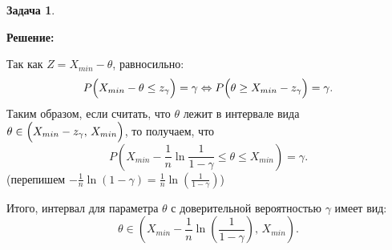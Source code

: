\documentclass[a4paper,11pt]{article}
\newenvironment{shdd}{\begin{mdframed}[backgroundcolor=shadecolor]}{\end{mdframed}}
\theoremstyle{definition}
\newtheorem{problem}{Задача}\setlength{\parindent}{0pt}
\newenvironment{solution}
{\begin{shdd}\textbf{Решение:}\par\setlength{\parindent}{0pt}}
{\end{shdd}}
\newenvironment{answer}
{\par\noindent\textbf{Ответ:}}
{\par}
\begin{document}
\begin{problem}
\begin{solution}
        Так как \(Z=X_{min}-\theta\), равносильно:
        \[
        P\Bigl(X_{min} -\theta \le z_\gamma \Bigr)=\gamma \Leftrightarrow P\Bigl(\theta \ge X_{min} - z_\gamma \Bigr)=\gamma.
        \]
        Таким образом, если считать, что \(\theta\) лежит в интервале вида
        \(\theta \in \Bigl(X_{min} - z_\gamma,\, X_{min}\Bigr)\),
        то получаем, что
        \[
        P\left(X_{min} - \frac{1}{n}\ln\frac{1}{1-\gamma} \le \theta \le X_{min}\right)=\gamma.
        \]
        (перепишем \(-\frac{1}{n}\ln(1-\gamma)=\frac{1}{n}\ln\left(\frac{1}{1-\gamma}\right)\))

        \vspace{10pt}
        Итого, интервал для параметра \(\theta\) с доверительной вероятностью \(\gamma\) имеет вид:
        \[
        \theta \in \left(X_{min} - \frac{1}{n}\ln\left(\frac{1}{1-\gamma}\right),\, X_{min}\right).
        \]
    \end{solution}
    


\end{problem}

\vspace{25pt}
\end{document}
